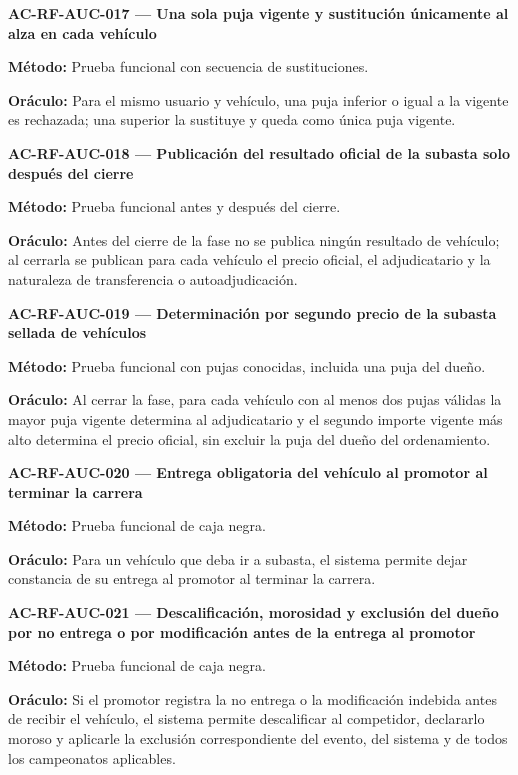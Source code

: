 \documentclass[10pt,letterpaper]{article}
\begin{document}
\noindent\textbf{AC-RF-AUC-017 --- Una sola puja vigente y sustitución únicamente al alza en cada vehículo}\par
\textbf{Método:} Prueba funcional con secuencia de sustituciones.\par
\textbf{Oráculo:} Para el mismo usuario y vehículo, una puja inferior o igual a la vigente es rechazada; una superior la sustituye y queda como única puja vigente.\par\vspace{0.45em}
\noindent\textbf{AC-RF-AUC-018 --- Publicación del resultado oficial de la subasta solo después del cierre}\par
\textbf{Método:} Prueba funcional antes y después del cierre.\par
\textbf{Oráculo:} Antes del cierre de la fase no se publica ningún resultado de vehículo; al cerrarla se publican para cada vehículo el precio oficial, el adjudicatario y la naturaleza de transferencia o autoadjudicación.\par\vspace{0.45em}
\noindent\textbf{AC-RF-AUC-019 --- Determinación por segundo precio de la subasta sellada de vehículos}\par
\textbf{Método:} Prueba funcional con pujas conocidas, incluida una puja del dueño.\par
\textbf{Oráculo:} Al cerrar la fase, para cada vehículo con al menos dos pujas válidas la mayor puja vigente determina al adjudicatario y el segundo importe vigente más alto determina el precio oficial, sin excluir la puja del dueño del ordenamiento.\par\vspace{0.45em}
\noindent\textbf{AC-RF-AUC-020 --- Entrega obligatoria del vehículo al promotor al terminar la carrera}\par
\textbf{Método:} Prueba funcional de caja negra.\par
\textbf{Oráculo:} Para un vehículo que deba ir a subasta, el sistema permite dejar constancia de su entrega al promotor al terminar la carrera.\par\vspace{0.45em}
\noindent\textbf{AC-RF-AUC-021 --- Descalificación, morosidad y exclusión del dueño por no entrega o por modificación antes de la entrega al promotor}\par
\textbf{Método:} Prueba funcional de caja negra.\par
\textbf{Oráculo:} Si el promotor registra la no entrega o la modificación indebida antes de recibir el vehículo, el sistema permite descalificar al competidor, declararlo moroso y aplicarle la exclusión correspondiente del evento, del sistema y de todos los campeonatos aplicables.\par\vspace{0.45em}
\end{document}
